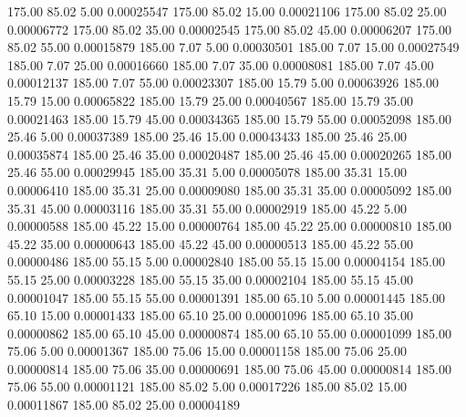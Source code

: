     175.00     85.02      5.00     0.00025547
    175.00     85.02     15.00     0.00021106
    175.00     85.02     25.00     0.00006772
    175.00     85.02     35.00     0.00002545
    175.00     85.02     45.00     0.00006207
    175.00     85.02     55.00     0.00015879
    185.00      7.07      5.00     0.00030501
    185.00      7.07     15.00     0.00027549
    185.00      7.07     25.00     0.00016660
    185.00      7.07     35.00     0.00008081
    185.00      7.07     45.00     0.00012137
    185.00      7.07     55.00     0.00023307
    185.00     15.79      5.00     0.00063926
    185.00     15.79     15.00     0.00065822
    185.00     15.79     25.00     0.00040567
    185.00     15.79     35.00     0.00021463
    185.00     15.79     45.00     0.00034365
    185.00     15.79     55.00     0.00052098
    185.00     25.46      5.00     0.00037389
    185.00     25.46     15.00     0.00043433
    185.00     25.46     25.00     0.00035874
    185.00     25.46     35.00     0.00020487
    185.00     25.46     45.00     0.00020265
    185.00     25.46     55.00     0.00029945
    185.00     35.31      5.00     0.00005078
    185.00     35.31     15.00     0.00006410
    185.00     35.31     25.00     0.00009080
    185.00     35.31     35.00     0.00005092
    185.00     35.31     45.00     0.00003116
    185.00     35.31     55.00     0.00002919
    185.00     45.22      5.00     0.00000588
    185.00     45.22     15.00     0.00000764
    185.00     45.22     25.00     0.00000810
    185.00     45.22     35.00     0.00000643
    185.00     45.22     45.00     0.00000513
    185.00     45.22     55.00     0.00000486
    185.00     55.15      5.00     0.00002840
    185.00     55.15     15.00     0.00004154
    185.00     55.15     25.00     0.00003228
    185.00     55.15     35.00     0.00002104
    185.00     55.15     45.00     0.00001047
    185.00     55.15     55.00     0.00001391
    185.00     65.10      5.00     0.00001445
    185.00     65.10     15.00     0.00001433
    185.00     65.10     25.00     0.00001096
    185.00     65.10     35.00     0.00000862
    185.00     65.10     45.00     0.00000874
    185.00     65.10     55.00     0.00001099
    185.00     75.06      5.00     0.00001367
    185.00     75.06     15.00     0.00001158
    185.00     75.06     25.00     0.00000814
    185.00     75.06     35.00     0.00000691
    185.00     75.06     45.00     0.00000814
    185.00     75.06     55.00     0.00001121
    185.00     85.02      5.00     0.00017226
    185.00     85.02     15.00     0.00011867
    185.00     85.02     25.00     0.00004189
